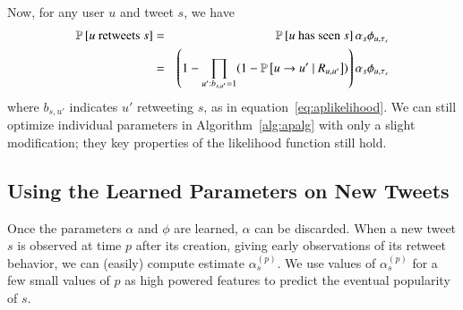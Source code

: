 Now, for any user $u$ and tweet $s$, we have
\begin{eqnarray}
  \mathbb{P} \left[\mbox{$u$ retweets $s$}\right] &=& \mathbb{P} \left[\mbox{$u$ has seen $s$}\right]\alpha_s\phi_{u,\tau_s}\nonumber\\
  &=&\left(1-\prod_{u':b_{s,u'}=1}(1-\mathbb{P} \left[u\to u'~|~R_{u,u'}\right])\right)\alpha_s\phi_{u,\tau_s}\label{eq:apeqfinal}
\end{eqnarray}
where $b_{s,u'}$ indicates $u'$ retweeting $s$, as in equation~\eqref{eq:aplikelihood}.  
We can still optimize individual parameters in Algorithm~\ref{alg:apalg} with only a slight modification; they key properties of the likelihood function still hold.  

\subsection{Using the Learned Parameters on New Tweets}

Once the parameters $\alpha$  and $\phi$ are learned, $\alpha$ can be discarded.
When a new tweet $s$ is observed at time $p$ after its creation, giving early observations of its retweet behavior, we can (easily) compute estimate $\alpha_s^{(p)}$.
We use values of $\alpha_s^{(p)}$ for a few small values of $p$ as high powered features to predict the eventual popularity of $s$.


